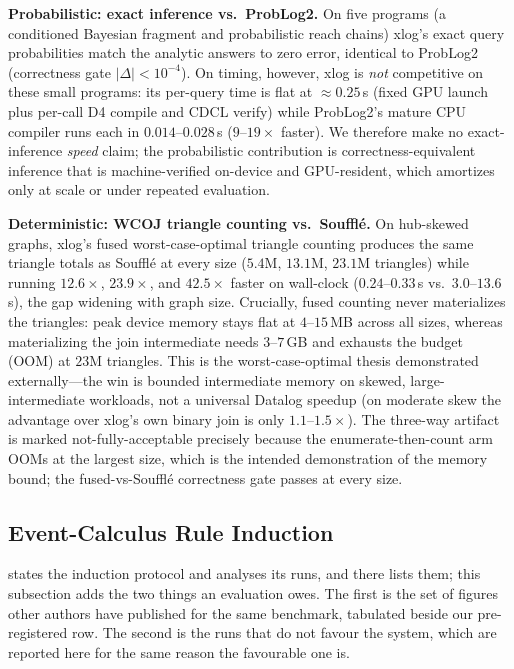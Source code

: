 \textbf{Probabilistic: exact inference vs.\ ProbLog2.} On five programs (a conditioned Bayesian fragment and probabilistic reach chains) xlog's exact query probabilities match the analytic answers to zero error, identical to ProbLog2 (correctness gate $|\Delta| < 10^{-4}$). On timing, however, xlog is \emph{not} competitive on these small programs: its per-query time is flat at ${\approx}0.25$\,s (fixed GPU launch plus per-call D4 compile and CDCL verify) while ProbLog2's mature CPU compiler runs each in $0.014$--$0.028$\,s ($9$--$19\times$ faster). We therefore make no exact-inference \emph{speed} claim; the probabilistic contribution is correctness-equivalent inference that is machine-verified on-device and GPU-resident, which amortizes only at scale or under repeated evaluation.

\textbf{Deterministic: WCOJ triangle counting vs.\ Soufflé.} On hub-skewed graphs, xlog's fused worst-case-optimal triangle counting produces the same triangle totals as Soufflé at every size ($5.4$M, $13.1$M, $23.1$M triangles) while running $12.6\times$, $23.9\times$, and $42.5\times$ faster on wall-clock ($0.24$--$0.33$\,s vs.\ $3.0$--$13.6$\,s), the gap widening with graph size. Crucially, fused counting never materializes the triangles: peak device memory stays flat at $4$--$15$\,MB across all sizes, whereas materializing the join intermediate needs $3$--$7$\,GB and exhausts the budget (OOM) at $23$M triangles. This is the worst-case-optimal thesis demonstrated externally---the win is bounded intermediate memory on skewed, large-intermediate workloads, not a universal Datalog speedup (on moderate skew the advantage over xlog's own binary join is only $1.1$--$1.5\times$). The three-way artifact is marked not-fully-acceptable precisely because the enumerate-then-count arm OOMs at the largest size, which is the intended demonstration of the memory bound; the fused-vs-Soufflé correctness gate passes at every size.

\subsection{Event-Calculus Rule Induction}\label{sec:ec-eval}

 states the induction protocol and analyses its runs, and  there lists them; this subsection adds the two things an evaluation owes. The first is the set of figures other authors have published for the same benchmark, tabulated beside our pre-registered row. The second is the runs that do not favour the system, which are reported here for the same reason the favourable one is.

